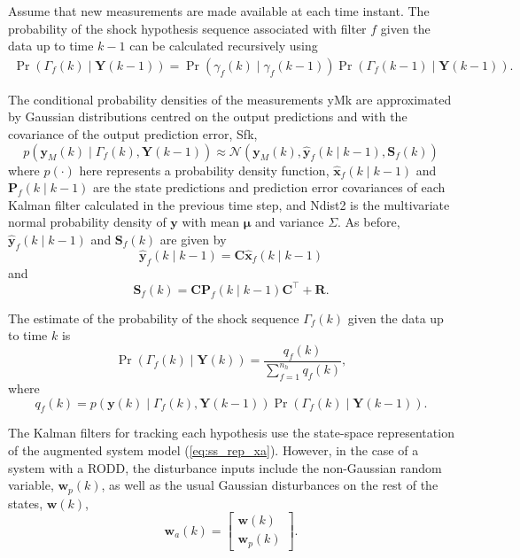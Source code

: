 Assume that new measurements are made available at each time instant. The probability of the shock hypothesis sequence associated with filter $f$ given the data up to time $k-1$ can be calculated recursively using
\begin{multline} \label{eq:Pr_Gammak_given_Ykm1}
	\Pr(\Gamma_f(k) \mid \mathbf{Y}(k-1)) = 
	\Pr(\gamma_f(k) \mid \gamma_f(k-1)) \Pr(\Gamma_f(k-1) \mid \mathbf{Y}(k-1)).
\end{multline}

The conditional probability densities of the measurements \gls{yMk} are approximated by Gaussian distributions centred on the output predictions and with the covariance of the output prediction error, \gls{Sfk},
\begin{equation} \label{eq:p_yk_given_Gammak_Ykm1}
	p(\mathbf{y}_M(k) \mid \Gamma_f(k), \mathbf{Y}(k-1)) \approx \mathcal{N}\left(\mathbf{y}_M(k), \mathbf{\hat{y}}_{f}(k \mid k-1),	\mathbf{S}_f(k) \right)
\end{equation}
where $p(\cdot)$ here represents a probability density function, $\mathbf{\hat{x}}_{f}(k \mid k-1)$ and $\mathbf{P}_f(k \mid k-1)$ are the state predictions and prediction error covariances of each Kalman filter calculated in the previous time step, and \gls{Ndist2} is the multivariate normal probability density of $\mathbf{y}$ with mean $\mathbf{\mu}$ and variance $\Sigma$. As before, $\mathbf{\hat{y}}_{f}(k \mid k-1)$ and $\mathbf{S}_f(k) $ are given by 
\begin{equation} \label{eq:yfk_pred}
	\mathbf{\hat{y}}_{f}(k \mid k-1) = \mathbf{C}\mathbf{\hat{x}}_{f}(k \mid k-1)
\end{equation}
and
\begin{equation} \label{eq:Sfk}
	\mathbf{S}_f(k) = \mathbf{C}\mathbf{P}_f(k \mid k-1)\mathbf{C}^\intercal + \mathbf{R}.
\end{equation}

The estimate of the probability of the shock sequence $\Gamma_f(k)$ given the data up to time $k$ is
\begin{equation} \label{eq:Pr_Gammak_given_Yk}
	\Pr(\Gamma_f(k) \mid \mathbf{Y}(k)) = \frac{q_f(k)}{\sum_{f=1}^{n_h} q_f(k)},
\end{equation}
where
\begin{equation} \label{eq:qfk}
	q_f(k) = p(\mathbf{y}(k) \mid \Gamma_f(k), \mathbf{Y}(k-1)) \Pr(\Gamma_f(k) \mid \mathbf{Y}(k-1)).
\end{equation}

The Kalman filters for tracking each hypothesis use the state-space representation of the augmented system model (\ref{eq:ss_rep_xa}). 
However, in the case of a system with a \gls{RODD}, the disturbance inputs include the non-Gaussian random variable, $\mathbf{w}_p(k)$, as well as the usual Gaussian disturbances on the rest of the states, $\mathbf{w}(k)$,
\begin{equation} \label{eq:wak}
	\mathbf{w}_a(k) = \begin{bmatrix}
		\mathbf{w}(k) \\
		\mathbf{w}_p(k)
	\end{bmatrix}.
\end{equation}

